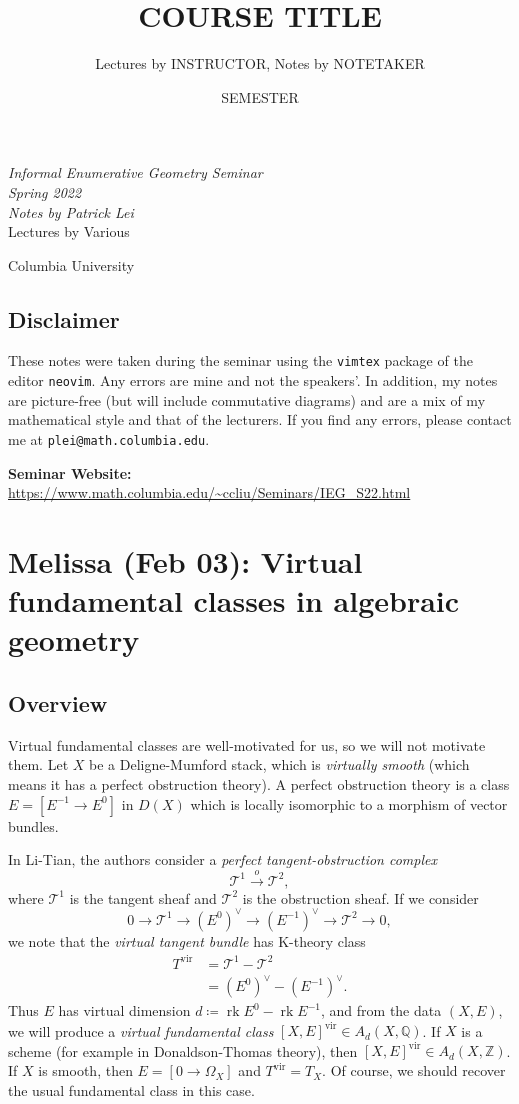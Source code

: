 \documentclass[leqno, openany]{memoir}
\title{COURSE TITLE}
\author{Lectures by INSTRUCTOR, Notes by NOTETAKER}
\date{SEMESTER}
\theoremstyle{definition}
\theoremstyle{remark}
\theoremstyle{plain}
\theoremstyle{definition}
\theoremstyle{remark}
\newcommand{\Z}{\mathbb{Z}}
\newcommand{\Q}{\mathbb{Q}}
\newcommand{\mc}[1]{\mathcal{#1}}
\newcommand{\mr}[1]{\mathrm{#1}}
\newcommand{\on}[1]{\operatorname{#1}}
\newcommand*{\titleSW}
    {\begingroup%
    \raggedleft
    \vspace*{\baselineskip}
    {\Huge\itshape Informal Enumerative Geometry Seminar \\ Spring 2022}\\[\baselineskip]
    {\large\itshape Notes by Patrick Lei}\\[0.2\textheight]
    {\Large Lectures by Various}\par
    \vfill
    {\Large \sffamily Columbia University}
    \vspace*{\baselineskip}
\endgroup}
\begin{document}
    
\begin{titlingpage}
\titleSW
\end{titlingpage}

\thispagestyle{empty}
\section*{Disclaimer}%
\label{sec:disclaimer}

These notes were taken during the seminar using the \texttt{vimtex} package of the editor \texttt{neovim}. 
Any errors are mine and not the speakers'. 
In addition, my notes are picture-free (but will include commutative diagrams) and are a mix of my mathematical style and that of the lecturers.
If you find any errors, please contact me at \texttt{plei@math.columbia.edu}.

\vspace*{1cm}

\noindent\textbf{Seminar Website:}  \url{https://www.math.columbia.edu/~ccliu/Seminars/IEG_S22.html}
\newpage

\tableofcontents

\chapter{Melissa (Feb 03): Virtual fundamental classes in algebraic geometry}%
\label{cha:Melissa_Feb_03_Virtual_fundamental_classes_in_algebraic_geometry}

\section{Overview}
Virtual fundamental classes are well-motivated for us, so we will not motivate them. Let $X$ be a Deligne-Mumford stack, which is \textit{virtually smooth} (which means it has a perfect obstruction theory). A perfect obstruction theory is a class $E = [E^{-1} \to E^0]$ in $D(X)$ which is locally isomorphic to a morphism of vector bundles.

In Li-Tian, the authors consider a \textit{perfect tangent-obstruction complex}
\[ \mc{T}^1 \xrightarrow{o} \mc{T}^2, \]
where $\mc{T}^1$ is the tangent sheaf and $\mc{T}^2$ is the obstruction sheaf. If we consider
\[ 0 \to \mc{T}^1 \to (E^0)^{\vee} \to (E^{-1})^{\vee} \to \mc{T}^2 \to 0, \]
we note that the \textit{virtual tangent bundle} has K-theory class
\begin{align*}
    T^{\mr{vir}} &= \mc{T}^1 - \mc{T}^2 \\
    &= (E^0)^{\vee} - (E^{-1})^{\vee}.
\end{align*}
Thus $E$ has virtual dimension $d \coloneqq \on{rk} E^0 - \on{rk} E^{-1}$, and from the data $(X, E)$, we will produce a \textit{virtual fundamental class} $[X,E]^{\mr{vir}} \in A_d(X, \Q)$. If $X$ is a scheme (for example in Donaldson-Thomas theory), then $[X, E]^{\mr{vir}} \in A_d(X, \Z)$. If $X$ is smooth, then $E = [0 \to \Omega_X]$ and $T^{\mr{vir}} = T_X$. Of course, we should recover the usual fundamental class in this case.
\end{document}
